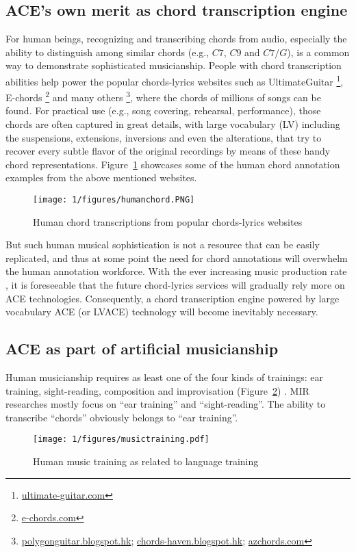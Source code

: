 \subsection{ACE's own merit as chord transcription engine}
For human beings, recognizing and transcribing chords from audio, especially the ability to distinguish among similar chords (e.g., $C7$, $C9$ and $C7/G$), is a common way to demonstrate sophisticated musicianship. People with chord transcription abilities help power the popular chords-lyrics websites such as UltimateGuitar \footnote{\url{ultimate-guitar.com}}, E-chords \footnote{\url{e-chords.com}} and many others \footnote{\url{polygonguitar.blogspot.hk}; \url{chords-haven.blogspot.hk}; \url{azchords.com}}, where the chords of millions of songs can be found. For practical use (e.g., song covering, rehearsal, performance), those chords are often captured in great details, with large vocabulary (LV) including the suspensions, extensions, inversions and even the alterations, that try to recover every subtle flavor of the original recordings by means of these handy chord representations. Figure~\ref{fig:1-humanchord} showcases some of the human chord annotation examples from the above mentioned websites.
\begin{figure}[htb]
\centering
\texttt{[image: 1/figures/humanchord.PNG]}
\caption{Human chord transcriptions from popular chords-lyrics websites}
\label{fig:1-humanchord}
\end{figure}

But such human musical sophistication is not a resource that can be easily replicated, and thus at some point the need for chord annotations will overwhelm the human annotation workforce. With the ever increasing music production rate \cite{globalmusicreport}, it is foreseeable that the future chord-lyrics services will gradually rely more on ACE technologies. Consequently, a chord transcription engine powered by large vocabulary ACE (or LVACE) technology will become inevitably necessary.

\subsection{ACE as part of artificial musicianship}
Human musicianship requires as least one of the four kinds of trainings: ear training, sight-reading, composition and improvisation (Figure~\ref{fig:1-musictraining}) . MIR researches mostly focus on ``ear training'' and ``sight-reading''. The ability to transcribe ``chords'' obviously belongs to ``ear training''.
\begin{figure}[htb]
\centering
\texttt{[image: 1/figures/musictraining.pdf]}
\caption{Human music training as related to language training}
\label{fig:1-musictraining}
\end{figure}

